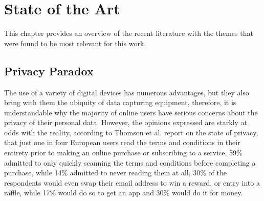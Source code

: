 %
%
\section{State of the Art}\label{section:state_of_the_art}

\par
This chapter provides an overview of the recent literature with the themes
that were found to be most relevant for this work.

\subsection{Privacy Paradox}\label{subsection:privacy_paradox}

The use of a variety of digital devices has numerous advantages, but they
also bring with them the ubiquity of data capturing equipment, therefore,
it is understandable why the majority of online users have serious concerns
about the privacy of their personal data. However, the opinions expressed
are starkly at odds with the reality, according to Thomson et al. \cite{DarrenState}
report on the state of privacy, that just one in four European users read
the terms and conditions in their entirety prior to making an online purchase
or subscribing to a service, 59\% admitted to only quickly scanning the
terms and conditions before completing a purchase, while 14\% admitted to
never reading them at all, 30\% of the respondents would even swap their
email address to win a reward, or entry into a raffle, while 17\% would do
so to get an app and 30\% would do it for money.

